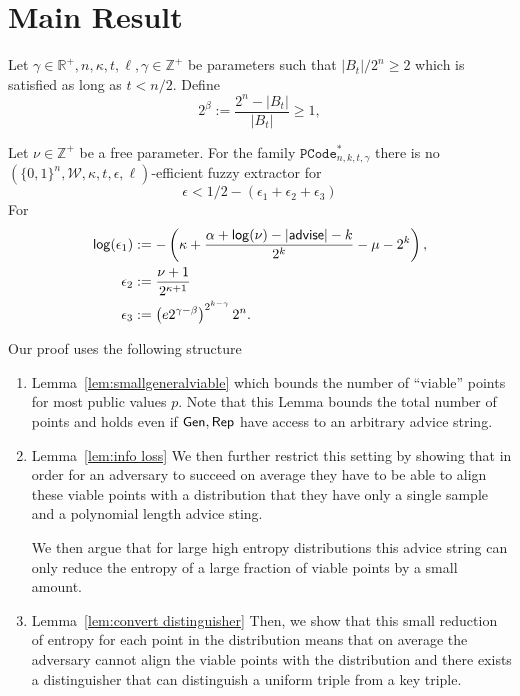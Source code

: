 

\section{Main Result}
\begin{theorem}
Let $\gamma \in\mathbb{R}^+, n, \kappa, t, \ell, \gamma \in\mathbb{Z}^+$ be parameters such that $|B_t|/2^n\ge 2$ which is satisfied as long as $t< n/2 $. Define \[2^\beta:=\frac{2^n-|B_t|}{|B_t|}\ge 1,\] 

Let $\nu \in \mathbb{Z}^+$ be a free parameter.
For the  family $ \mathtt{PCode}_{n, k, t, \gamma}^{*}$ there is no $(\{0,1\}^n, \mathcal{W}, \kappa, t, \epsilon, \ell)$-efficient fuzzy extractor for 
\[
\epsilon< 1/2 - (\epsilon_1+\epsilon_2+\epsilon_3)
\]
For 
\begin{align*}\mathsf{log}\!\left(\epsilon_1\right)&:= -\left(\kappa+\frac{\alpha +\mathsf{log}\!\left(\nu\right)-|{\mathsf{advise}}|-k}{2^k} - \mu -2^k\right),\\
\epsilon_2&:=\frac{\nu+1}{2^{\kappa+1}}\\
\epsilon_3&:=\left(e2^{\gamma-\beta}\right)^{2^{k-\gamma}}2^n.
\end{align*}
\label{thm:main theorem}
\end{theorem}

Our proof uses the following structure
\begin{enumerate}
\item Lemma~\ref{lem:smallgeneralviable} which bounds the number of ``viable'' points for most public values $p$.  Note that this Lemma bounds the total number of points and holds even if ${\mathsf{Gen}}, {\mathsf{Rep}}$ have access to an arbitrary advice string.
\item Lemma~\ref{lem:info loss} We then further restrict this setting by showing that in order for an adversary to succeed on average they have to be able to align these viable points with a distribution that they have only a single sample and a polynomial length advice sting. 

 We then argue that for large high entropy distributions this advice string can only reduce the entropy of a large fraction of viable points by a small amount. 
\item Lemma~\ref{lem:convert distinguisher} Then, we show that this small reduction of entropy for each point in the distribution means that on average the adversary cannot align the viable points with the distribution and there exists a distinguisher that can distinguish a uniform triple from a key triple. 
\end{enumerate}

